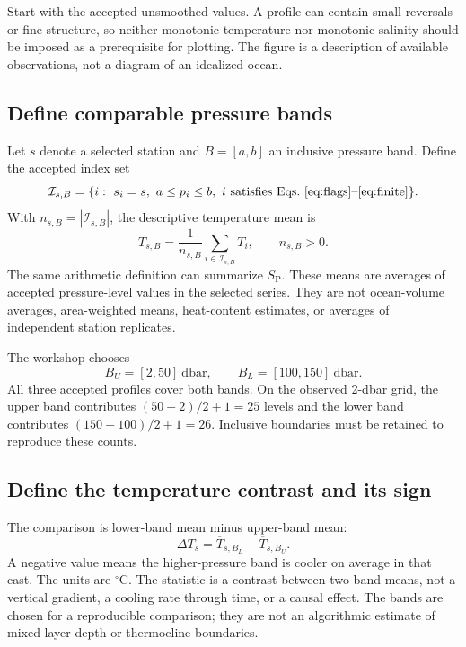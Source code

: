 \documentclass[11pt,letterpaper]{article}
\newcommand{\degC}{\ensuremath{{}^{\circ}\mathrm{C}}}
\newcommand{\SP}{\ensuremath{S_{\mathrm{P}}}}
\begin{document}
Start with the accepted unsmoothed values. A profile can contain small reversals or fine structure, so neither monotonic temperature nor monotonic salinity should be imposed as a prerequisite for plotting. The figure is a description of available observations, not a diagram of an idealized ocean.

\subsection{Define comparable pressure bands}
Let $s$ denote a selected station and $B=[a,b]$ an inclusive pressure band. Define the accepted index set
\begin{equation}
\mathcal{I}_{s,B}=\{i:\ s_i=s,\ a\leq p_i\leq b,\ i\ \text{satisfies Eqs.~\eqref{eq:flags}--\eqref{eq:finite}}\}.
\end{equation}
With $n_{s,B}=|\mathcal{I}_{s,B}|$, the descriptive temperature mean is
\begin{equation}
\overline{T}_{s,B}=\frac{1}{n_{s,B}}\sum_{i\in\mathcal{I}_{s,B}}T_i,
\qquad n_{s,B}>0.
\label{eq:mean}
\end{equation}
The same arithmetic definition can summarize \SP. These means are averages of accepted pressure-level values in the selected series. They are not ocean-volume averages, area-weighted means, heat-content estimates, or averages of independent station replicates.

The workshop chooses
\[
B_U=[2,50]\ \mathrm{dbar},\qquad B_L=[100,150]\ \mathrm{dbar}.
\]
All three accepted profiles cover both bands. On the observed 2-dbar grid, the upper band contributes $(50-2)/2+1=25$ levels and the lower band contributes $(150-100)/2+1=26$. Inclusive boundaries must be retained to reproduce these counts.

\subsection{Define the temperature contrast and its sign}
The comparison is lower-band mean minus upper-band mean:
\begin{equation}
\Delta T_s=\overline{T}_{s,B_L}-\overline{T}_{s,B_U}.
\label{eq:contrast}
\end{equation}
A negative value means the higher-pressure band is cooler on average in that cast. The units are \degC. The statistic is a contrast between two band means, not a vertical gradient, a cooling rate through time, or a causal effect. The bands are chosen for a reproducible comparison; they are not an algorithmic estimate of mixed-layer depth or thermocline boundaries.
\end{document}
